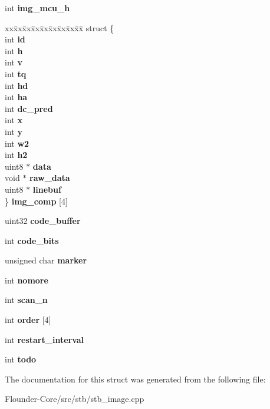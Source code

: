 \begin{DoxyCompactItemize}
int {\bfseries img\+\_\+mcu\+\_\+h}
\item 
\mbox{\label{structjpeg_a1c4874d5cf0e2b80dc0d0b47ddd8be7a}} 
\begin{tabbing}
xx\=xx\=xx\=xx\=xx\=xx\=xx\=xx\=xx\=\kill
struct \{\\
\>int {\bfseries id}\\
\>int {\bfseries h}\\
\>int {\bfseries v}\\
\>int {\bfseries tq}\\
\>int {\bfseries hd}\\
\>int {\bfseries ha}\\
\>int {\bfseries dc\_pred}\\
\>int {\bfseries x}\\
\>int {\bfseries y}\\
\>int {\bfseries w2}\\
\>int {\bfseries h2}\\
\>uint8 $\ast$ {\bfseries data}\\
\>void $\ast$ {\bfseries raw\_data}\\
\>uint8 $\ast$ {\bfseries linebuf}\\
\} {\bfseries img\_comp} \mbox{[}4\mbox{]}\\

\end{tabbing}\item 
\mbox{\label{structjpeg_abfc7f6a333ba3517e669e3e58113bbca}} 
uint32 {\bfseries code\+\_\+buffer}
\item 
\mbox{\label{structjpeg_a6d1b20b5d9d253006fde4e4dd8ab8c04}} 
int {\bfseries code\+\_\+bits}
\item 
\mbox{\label{structjpeg_a9a5cd40790fd432795fb19477c921f8c}} 
unsigned char {\bfseries marker}
\item 
\mbox{\label{structjpeg_a2d114f4d52f50d8d85f43b2a3f161cec}} 
int {\bfseries nomore}
\item 
\mbox{\label{structjpeg_adca2f04da72e50086c77c7070731a679}} 
int {\bfseries scan\+\_\+n}
\item 
\mbox{\label{structjpeg_ac0f5240fc472e75239328f51a50f45b6}} 
int {\bfseries order} \mbox{[}4\mbox{]}
\item 
\mbox{\label{structjpeg_ab13af34259b1f1c6cf8f35411a77e39e}} 
int {\bfseries restart\+\_\+interval}
\item 
\mbox{\label{structjpeg_a6b4a8a352872847d84ea5ef1a4bc245e}} 
int {\bfseries todo}
\end{DoxyCompactItemize}


The documentation for this struct was generated from the following file\+:\begin{DoxyCompactItemize}
\item 
Flounder-\/\+Core/src/stb/stb\+\_\+image.\+cpp\end{DoxyCompactItemize}
